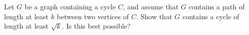 \begin{hwproblem}{6}{
    Let $G$ be a graph containing a cycle $C$, and assume that $G$
    contains a path of length at least $k$ between two vertices of $C$. Show 
    that $G$ contains a cycle of length at least $\sqrt{k}$. Is this best 
    possible?
  }
\end{hwproblem}
